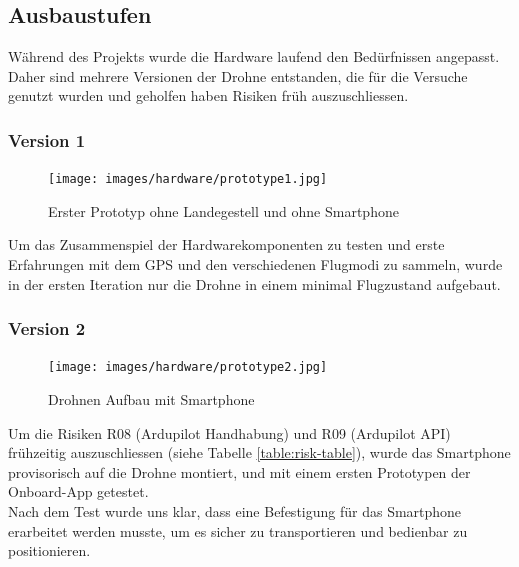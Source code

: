 \subsection{Ausbaustufen}

Während des Projekts wurde die Hardware laufend den Bedürfnissen angepasst. Daher sind mehrere Versionen der Drohne entstanden, die für die Versuche genutzt wurden und geholfen haben Risiken früh auszuschliessen.

\subsubsection{Version 1}

\begin{figure}[H]
\centering
\texttt{[image: images/hardware/prototype1.jpg]}
\caption{Erster Prototyp ohne Landegestell und ohne Smartphone}
\label{fig:prototyp-1}
\end{figure}

Um das Zusammenspiel der Hardwarekomponenten zu testen und erste Erfahrungen mit dem GPS und den verschiedenen Flugmodi zu sammeln, wurde in der ersten Iteration nur die Drohne in einem minimal Flugzustand aufgebaut.

\subsubsection{Version 2}

\begin{figure}[H]
\centering
\texttt{[image: images/hardware/prototype2.jpg]}
\caption{Drohnen Aufbau mit Smartphone}
\label{fig:prototyp-2}
\end{figure}

Um die Risiken R08 (Ardupilot Handhabung) und R09 (Ardupilot API) frühzeitig auszuschliessen (siehe Tabelle \ref{table:risk-table}), wurde das Smartphone provisorisch auf die Drohne montiert, und mit einem ersten Prototypen der Onboard-App getestet. \\
Nach dem Test wurde uns klar, dass eine Befestigung für das Smartphone erarbeitet werden musste, um es sicher zu transportieren und bedienbar zu positionieren.

